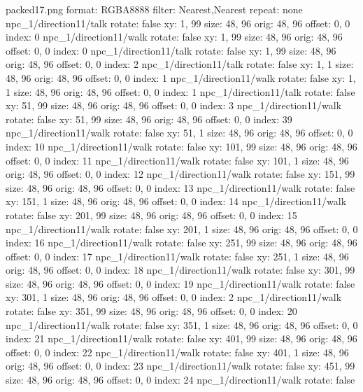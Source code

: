 packed17.png
format: RGBA8888
filter: Nearest,Nearest
repeat: none
npc_1/direction11/talk
  rotate: false
  xy: 1, 99
  size: 48, 96
  orig: 48, 96
  offset: 0, 0
  index: 0
npc_1/direction11/walk
  rotate: false
  xy: 1, 99
  size: 48, 96
  orig: 48, 96
  offset: 0, 0
  index: 0
npc_1/direction11/talk
  rotate: false
  xy: 1, 99
  size: 48, 96
  orig: 48, 96
  offset: 0, 0
  index: 2
npc_1/direction11/talk
  rotate: false
  xy: 1, 1
  size: 48, 96
  orig: 48, 96
  offset: 0, 0
  index: 1
npc_1/direction11/walk
  rotate: false
  xy: 1, 1
  size: 48, 96
  orig: 48, 96
  offset: 0, 0
  index: 1
npc_1/direction11/talk
  rotate: false
  xy: 51, 99
  size: 48, 96
  orig: 48, 96
  offset: 0, 0
  index: 3
npc_1/direction11/walk
  rotate: false
  xy: 51, 99
  size: 48, 96
  orig: 48, 96
  offset: 0, 0
  index: 39
npc_1/direction11/walk
  rotate: false
  xy: 51, 1
  size: 48, 96
  orig: 48, 96
  offset: 0, 0
  index: 10
npc_1/direction11/walk
  rotate: false
  xy: 101, 99
  size: 48, 96
  orig: 48, 96
  offset: 0, 0
  index: 11
npc_1/direction11/walk
  rotate: false
  xy: 101, 1
  size: 48, 96
  orig: 48, 96
  offset: 0, 0
  index: 12
npc_1/direction11/walk
  rotate: false
  xy: 151, 99
  size: 48, 96
  orig: 48, 96
  offset: 0, 0
  index: 13
npc_1/direction11/walk
  rotate: false
  xy: 151, 1
  size: 48, 96
  orig: 48, 96
  offset: 0, 0
  index: 14
npc_1/direction11/walk
  rotate: false
  xy: 201, 99
  size: 48, 96
  orig: 48, 96
  offset: 0, 0
  index: 15
npc_1/direction11/walk
  rotate: false
  xy: 201, 1
  size: 48, 96
  orig: 48, 96
  offset: 0, 0
  index: 16
npc_1/direction11/walk
  rotate: false
  xy: 251, 99
  size: 48, 96
  orig: 48, 96
  offset: 0, 0
  index: 17
npc_1/direction11/walk
  rotate: false
  xy: 251, 1
  size: 48, 96
  orig: 48, 96
  offset: 0, 0
  index: 18
npc_1/direction11/walk
  rotate: false
  xy: 301, 99
  size: 48, 96
  orig: 48, 96
  offset: 0, 0
  index: 19
npc_1/direction11/walk
  rotate: false
  xy: 301, 1
  size: 48, 96
  orig: 48, 96
  offset: 0, 0
  index: 2
npc_1/direction11/walk
  rotate: false
  xy: 351, 99
  size: 48, 96
  orig: 48, 96
  offset: 0, 0
  index: 20
npc_1/direction11/walk
  rotate: false
  xy: 351, 1
  size: 48, 96
  orig: 48, 96
  offset: 0, 0
  index: 21
npc_1/direction11/walk
  rotate: false
  xy: 401, 99
  size: 48, 96
  orig: 48, 96
  offset: 0, 0
  index: 22
npc_1/direction11/walk
  rotate: false
  xy: 401, 1
  size: 48, 96
  orig: 48, 96
  offset: 0, 0
  index: 23
npc_1/direction11/walk
  rotate: false
  xy: 451, 99
  size: 48, 96
  orig: 48, 96
  offset: 0, 0
  index: 24
npc_1/direction11/walk
  rotate: false
